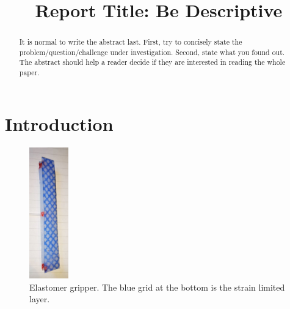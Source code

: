 \documentclass[conference]{IEEEtran}
\begin{document}
\title{Report Title: Be Descriptive}

\author{
    \and
}

\maketitle

\begin{abstract}
It is normal to write the abstract last.  First, try to concisely state the problem/question/challenge under investigation.  Second, state what you found out.  The abstract should help a reader decide if they are interested in reading the whole paper.  
\end{abstract}

% 

\section{Introduction}


\begin{figure}
  \label{fig:Elastomer}
  \centering
  \includegraphics[width=0.15\textwidth]{pics/弹性体示意图.png}
  \caption{Elastomer gripper. The blue grid at the bottom is the strain limited layer.}
\end{figure}
\end{document}
